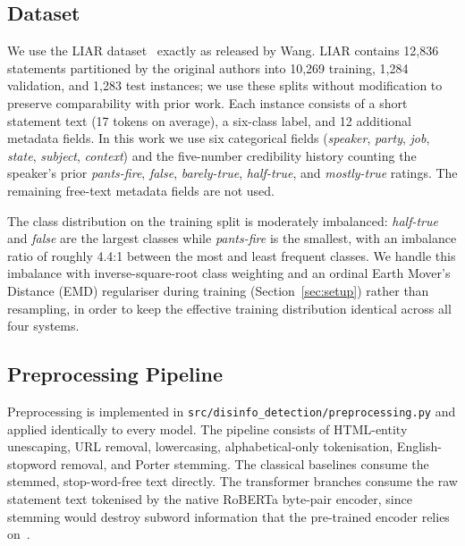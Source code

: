 \documentclass[journal]{IEEEtran}
\begin{document}
\subsection{Dataset}
We use the LIAR dataset~\cite{wang2017liar} exactly as released by Wang. LIAR contains 12{,}836 statements partitioned by the original authors into 10{,}269 training, 1{,}284 validation, and 1{,}283 test instances; we use these splits without modification to preserve comparability with prior work. Each instance consists of a short statement text (17 tokens on average), a six-class label, and 12 additional metadata fields. In this work we use six categorical fields (\emph{speaker}, \emph{party}, \emph{job}, \emph{state}, \emph{subject}, \emph{context}) and the five-number credibility history counting the speaker's prior \emph{pants-fire}, \emph{false}, \emph{barely-true}, \emph{half-true}, and \emph{mostly-true} ratings. The remaining free-text metadata fields are not used.

The class distribution on the training split is moderately imbalanced: \emph{half-true} and \emph{false} are the largest classes while \emph{pants-fire} is the smallest, with an imbalance ratio of roughly 4.4:1 between the most and least frequent classes. We handle this imbalance with inverse-square-root class weighting and an ordinal Earth Mover's Distance (EMD) regulariser during training (Section~\ref{sec:setup}) rather than resampling, in order to keep the effective training distribution identical across all four systems.

\subsection{Preprocessing Pipeline}
Preprocessing is implemented in \texttt{src/disinfo\_detection/preprocessing.py} and applied identically to every model. The pipeline consists of HTML-entity unescaping, URL removal, lowercasing, alphabetical-only tokenisation, English-stopword removal, and Porter stemming. The classical baselines consume the stemmed, stop-word-free text directly. The transformer branches consume the raw statement text tokenised by the native RoBERTa byte-pair encoder, since stemming would destroy subword information that the pre-trained encoder relies on~\cite{devlin2019bert}.
\end{document}
